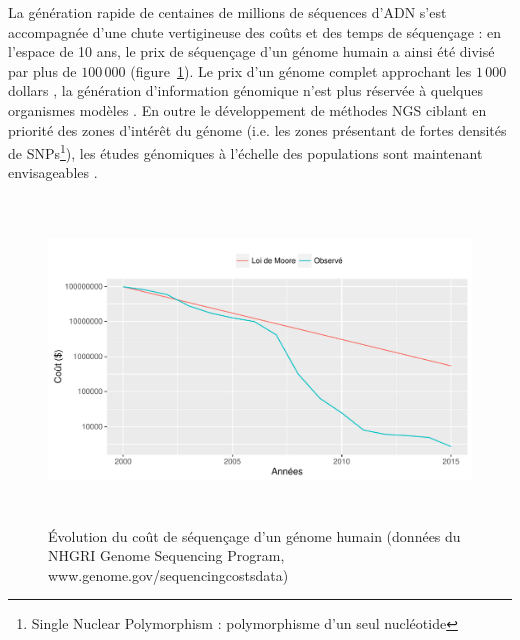 \documentclass[a4paper,12pt,twoside]{article}\usepackage[]{graphicx}\usepackage[]{color}
\newenvironment{knitrout}{}{} %
\begin{document}
\begin {bibunit} [newbst]
La génération rapide de centaines de millions de séquences d'ADN s'est accompagnée d'une chute vertigineuse des coûts et des temps de séquençage : en l'espace de 10 ans, le prix de séquençage d'un génome humain a ainsi été divisé par plus de $100\,000$ (figure~\ref{fig:moore}). Le prix d'un génome complet approchant les $1\,000$ dollars \citep{hayden20141}, la génération d'information génomique n'est plus réservée à quelques organismes modèles \citep{ekblom2014field, shafer2015genomics}. En outre le développement de méthodes NGS ciblant en priorité des zones d'intérêt du génome (i.e. les zones présentant de fortes densités de SNPs\footnote{Single Nuclear Polymorphism : polymorphisme d'un seul nucléotide}), les études génomiques à l'échelle des populations sont maintenant envisageables \citep{davey2010radseq}.

\begin{knitrout}
\color{fgcolor}\begin{figure}[htpb]

{\centering \includegraphics[width=15cm,height=8.6cm]{figure/moore-1} 

}

\caption[Évolution du coût de séquençage d'un génome humain]{Évolution du coût de séquençage d'un génome humain (données du NHGRI Genome Sequencing Program, www.genome.gov/sequencingcostsdata)}\label{fig:moore}
\end{figure}


\end{knitrout}


\end{bibunit}
\end{document}

